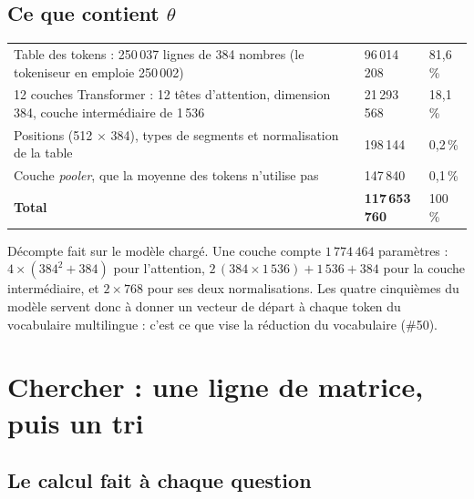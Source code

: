 \subsection{Ce que contient \texorpdfstring{$\theta$}{theta}}

\begin{tabletype}
\begin{tabularx}{\textwidth}{@{}YR{2.7cm}R{1.6cm}@{}}
\toprule
{} &  &  \\
\midrule
Table des tokens : 250\,037 lignes de 384 nombres (le tokeniseur en emploie 250\,002) & 96\,014\,208 & 81,6\,\% \\
12 couches Transformer : 12 têtes d'attention, dimension 384, couche intermédiaire de 1\,536 & 21\,293\,568 & 18,1\,\% \\
Positions (512 $\times$ 384), types de segments et normalisation de la table & 198\,144 & 0,2\,\% \\
Couche \emph{pooler}, que la moyenne des tokens n'utilise pas & 147\,840 & 0,1\,\% \\
\midrule
\textbf{Total} & \textbf{117\,653\,760} & 100\,\% \\
\bottomrule
\end{tabularx}
\end{tabletype}

\mesure Décompte fait sur le modèle chargé. Une couche compte $1\,774\,464$ paramètres : $4 \times (384^2 + 384)$
pour l'attention, $2\,(384 \times 1\,536) + 1\,536 + 384$ pour la couche intermédiaire, et $2 \times 768$ pour
ses deux normalisations. Les quatre cinquièmes du modèle servent donc à donner un vecteur de départ à chaque
token du vocabulaire multilingue : c'est ce que vise la réduction du vocabulaire (\#50).

\section{Chercher : une ligne de matrice, puis un tri}

\subsection{Le calcul fait à chaque question}

